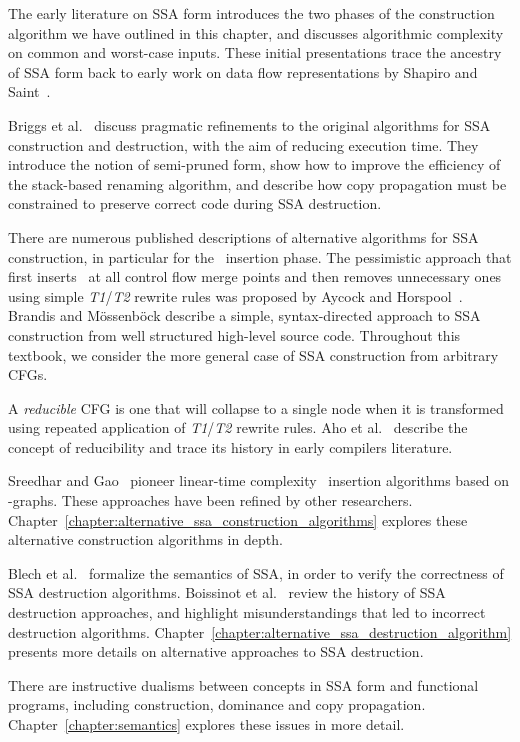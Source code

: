 {The early literature on SSA form
\cite{cytron89efficient,cytron91efficiently}
introduces the two phases of the construction algorithm
we have outlined in this chapter,
and discusses algorithmic complexity on common and worst-case inputs.
These initial presentations trace the ancestry of SSA form back to
early work on data flow representations by Shapiro and Saint~\cite{shapiro69representation}.

Briggs et al.~\cite{briggs98practical} discuss pragmatic
refinements to the original algorithms for SSA construction
and destruction, with the aim of reducing execution time.
They introduce the notion of semi-pruned form, %
show how to improve the efficiency of the stack-based renaming
algorithm,
and describe how copy propagation must be constrained to
preserve correct code during SSA destruction.

There are numerous published descriptions of alternative algorithms
for SSA construction, in particular for the \phifun\ insertion phase.
The pessimistic approach that first inserts \phifuns\ at all control
flow merge points and then removes unnecessary ones using simple
\emph{T1}/\emph{T2}
rewrite rules was proposed by Aycock
and Horspool~\cite{aycock00simple}. 
Brandis and M\"{o}ssenb\"{o}ck 
\cite{brandis94single}
describe a 
simple, syntax-directed approach to SSA construction from 
well structured high-level source code.
Throughout this textbook, we consider the more
general case of SSA construction from arbitrary CFGs.

A \textit{reducible} CFG is one that will collapse to a single node when 
it is transformed using repeated application of \emph{T1}/\emph{T2}
rewrite rules.
Aho et al.~\cite{aho86compilers} describe the concept of reducibility
and trace its history in early compilers literature.

Sreedhar and Gao~\cite{sreedhar95linear} pioneer
linear-time complexity 
\phifun\ insertion
algorithms based on \DJ-graphs.
These approaches have been refined by other researchers.
Chapter~\ref{chapter:alternative_ssa_construction_algorithms}
explores these alternative construction algorithms in depth.


Blech et al.~\cite{blech05optimizing}
formalize the semantics of SSA, in order to verify
the correctness of SSA destruction algorithms.
Boissinot et al.~\cite{boissinot09revisiting} review the history of SSA destruction approaches,
and highlight misunderstandings that led to incorrect destruction
algorithms.
Chapter~\ref{chapter:alternative_ssa_destruction_algorithm} presents
more details on alternative approaches to SSA destruction.

There are instructive dualisms between concepts in SSA form
and
functional programs, including construction, dominance and
copy propagation. Chapter~\ref{chapter:semantics} explores these issues
in more detail.


}

